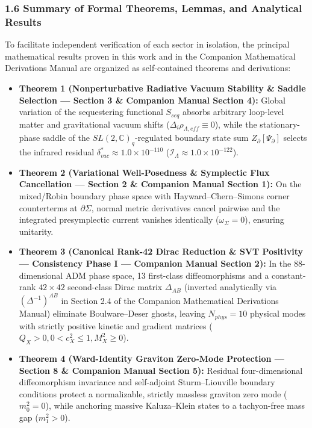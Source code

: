 \documentclass[aps,prd,onecolumn,superscriptaddress,nofootinbib,longbibliography,10pt]{revtex4-2}
\begin{document}
  
\subsubsection*{1.6 Summary of Formal Theorems, Lemmas, and Analytical Results}

  To facilitate independent verification of each sector in isolation, the principal mathematical results proven in this work and in the Companion Mathematical Derivations Manual are organized as self-contained theorems and derivations:


  
\begin{itemize}
    
\item \textbf{Theorem 1 (Nonperturbative Radiative Vacuum Stability \& Saddle Selection — Section 3 \& Companion Manual Section 4):} Global variation of the sequestering functional \(S_{seq}\) absorbs arbitrary loop-level matter and gravitational vacuum shifts (\(\Delta_i \rho_{\Lambda,eff} \equiv 0\)), while the stationary-phase saddle of the \(SL(2,\mathbb{C})_q\)-regulated boundary state sum \(Z_\partial[\Psi_\partial]\) selects the infrared residual \(\delta_{vac}^* \approx 1.0 \times 10^{-110}\) (\(\mathcal{I}_{\Lambda} \approx 1.0 \times 10^{-122}\)).
    
\item \textbf{Theorem 2 (Variational Well-Posedness \& Symplectic Flux Cancellation — Section 2 \& Companion Manual Section 1):} On the mixed/Robin boundary phase space with Hayward–Chern–Simons corner counterterms at \(\partial\Sigma\), normal metric derivatives cancel pairwise and the integrated presymplectic current vanishes identically (\(\omega_\Sigma = 0\)), ensuring unitarity.
    
\item \textbf{Theorem 3 (Canonical Rank-42 Dirac Reduction \& SVT Positivity — Consistency Phase I — Companion Manual Section 2):} In the 88-dimensional ADM phase space, 13 first-class diffeomorphisms and a constant-rank \(42 \times 42\) second-class Dirac matrix \(\Delta_{AB}\) (inverted analytically via \((\Delta^{-1})^{AB}\) in Section 2.4 of the Companion Mathematical Derivations Manual) eliminate Boulware–Deser ghosts, leaving \(N_{phys} = 10\) physical modes with strictly positive kinetic and gradient matrices (\(Q_X > 0, 0 < c_X^2 \le 1, M_X^2 \ge 0\)).
    
\item \textbf{Theorem 4 (Ward-Identity Graviton Zero-Mode Protection — Section 8 \& Companion Manual Section 5):} Residual four-dimensional diffeomorphism invariance and self-adjoint Sturm–Liouville boundary conditions protect a normalizable, strictly massless graviton zero mode (\(m_0^2 = 0\)), while anchoring massive Kaluza–Klein states to a tachyon-free mass gap (\(m_1^2 > 0\)).
    

\end{itemize}
\end{document}
